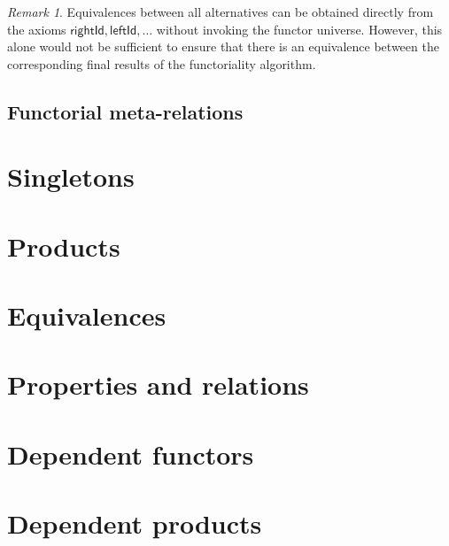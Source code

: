 \documentclass[a4paper]{article}
\theoremstyle{definition}
\theoremstyle{remark}
\newtheorem*{remark}{Remark}
\newcommand{\nm}{\mathsf}
\begin{document}
\begin{remark}
  Equivalences between all alternatives can be obtained directly from the axioms
  $\nm{rightId},\nm{leftId},\ldots$ without invoking the functor universe.
  However, this alone would not be sufficient to ensure that there is an equivalence
  between the corresponding final results of the functoriality algorithm.
\end{remark}

\subsection{Functorial meta-relations}

\section{Singletons}
\label{sec:singletons}

\section{Products}
\label{sec:products}

\section{Equivalences}
\label{sec:equivalences}

\section{Properties and relations}
\label{sec:properties}
\label{sec:relations}

\section{Dependent functors}

\section{Dependent products}
\end{document}
